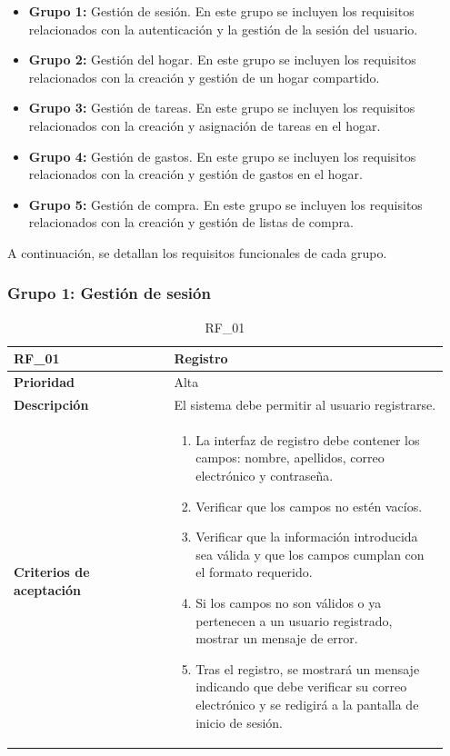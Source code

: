 \begin{itemize}
    \item \textbf{Grupo 1:} Gestión de sesión. En este grupo se incluyen los requisitos relacionados con la autenticación y la gestión de la sesión del usuario.
    \item \textbf{Grupo 2:} Gestión del hogar. En este grupo se incluyen los requisitos relacionados con la creación y gestión de un hogar compartido.
    \item \textbf{Grupo 3:} Gestión de tareas. En este grupo se incluyen los requisitos relacionados con la creación y asignación de tareas en el hogar.
    \item \textbf{Grupo 4:} Gestión de gastos. En este grupo se incluyen los requisitos relacionados con la creación y gestión de gastos en el hogar.
    \item \textbf{Grupo 5:} Gestión de compra. En este grupo se incluyen los requisitos relacionados con la creación y gestión de listas de compra.
\end{itemize}

A continuación, se detallan los requisitos funcionales de cada grupo.

\subsubsection{Grupo 1: Gestión de sesión}
\label{subsubsec:grupo1}


\begin{table}[htb!]
	\centering 
	\begin{tabular}{|p{0.35\linewidth}|p{0.6\linewidth}|}
		\hline
		\rowcolor[HTML]{C0C0C0}  
        \textbf{RF\_01} & \textbf{Registro} \\
		\hline
		\textbf{Prioridad} & Alta \\
		\hline
		\textbf{Descripción} & El sistema debe permitir al usuario registrarse.  \\
		\hline
		\vspace{0.5mm}
		\textbf{Criterios de aceptación} & 
		\begin{minipage}[t]{0.9\linewidth}
			\begin{enumerate}
				\item La interfaz de registro debe contener los campos: nombre, apellidos, correo electrónico y contraseña.
				\item Verificar que los campos no estén vacíos.
				\item Verificar que la información introducida sea válida y que los campos cumplan con el formato requerido.
				\item Si los campos no son válidos o ya pertenecen a un usuario registrado, mostrar un mensaje de error.
				\item Tras el registro, se mostrará un mensaje indicando que debe verificar su correo electrónico y se redigirá a la pantalla de inicio de sesión.
			\end{enumerate}
			\vspace{2mm}
		\end{minipage} \\
		\hline
	\end{tabular}
	\caption{RF\_01}
\end{table}

